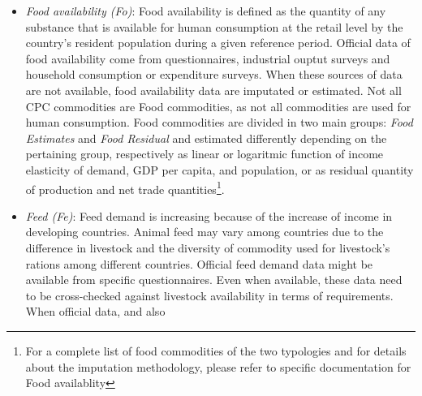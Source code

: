 \documentclass[]{article}
\let\rmarkdownfootnote\footnote%
\def\footnote{\protect\rmarkdownfootnote}
\begin{document}
\begin{itemize}
  pulses and sugar and, because they are very rarely measured by
  country, figures are very often imputed or estimated\^{}{[}For a
  complete list of stock commodities and for details about the
  imputation methodology, please refer to specific documentation for
  stock\}. Estimation of Changes in stock is based on opening stocks
  figures throught an approach that mantain time consistency of data
  that are available and official\footnote{All data are marked as
    \(official\), \(semi-official\) or \emph{unofficial}, depending on
    the source they come from, throught \(flags\). Flag management is
    one of the core responsibilities of the \emph{Office of the Chief
    Statistician} Department in FAO. Flags are used from all the
    estimation procedure for distinguishing between different level of
    reliability in the data. The most reliable data are used to estimate
    missing or less reliable data.{[}this has to be better specified{]}}.
\item
  \emph{Food availability (Fo)}: Food availability is defined as the
  quantity of any substance that is available for human consumption at
  the retail level by the country's resident population during a given
  reference period. Official data of food availability come from
  questionnaires, industrial ouptut surveys and household consumption or
  expenditure surveys. When these sources of data are not available,
  food availability data are imputated or estimated. Not all CPC
  commodities are Food commodities, as not all commodities are used for
  human consumption. Food commodities are divided in two main groups:
  \emph{Food Estimates} and \emph{Food Residual} and estimated
  differently depending on the pertaining group, respectively as linear
  or logaritmic function of income elasticity of demand, GDP per capita,
  and population, or as residual quantity of production and net trade
  quantities\footnote{For a complete list of food commodities of the two
    typologies and for details about the imputation methodology, please
    refer to specific documentation for Food availablity}.
\item
  \emph{Feed (Fe)}: Feed demand is increasing because of the increase of
  income in developing countries. Animal feed may vary among countries
  due to the difference in livestock and the diversity of commodity used
  for livestock's rations among different countries. Official feed
  demand data might be available from specific questionnaires. Even when
  available, these data need to be cross-checked against livestock
  availability in terms of requirements. When official data, and also

\end{itemize}
\end{document}
